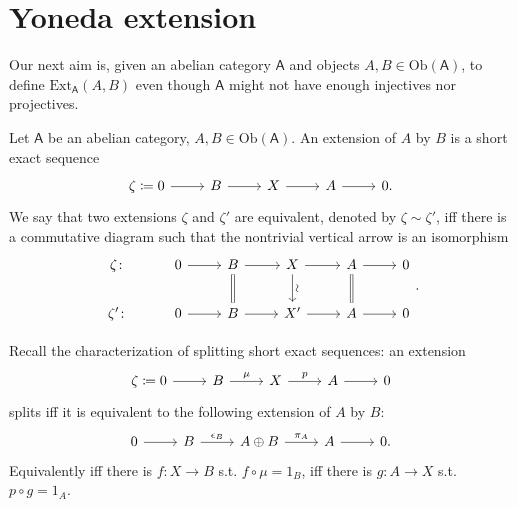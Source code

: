 \section{Yoneda extension}
Our next aim is, given an abelian category $\mathsf{A}$
and objects $A,B \in \mathrm{Ob} \left(\mathsf{A}\right)$,
to define $\mathrm{Ext}^{ }_{ \mathsf{A}} \left( A, B \right)$ even though
$\mathsf{A}$ might not have enough injectives nor projectives.

\begin{defn}[Extension]
	Let $\mathsf{A}$ be an abelian category, $A,B \in \mathrm{Ob} \left(\mathsf{A}\right)$.
	An extension of $A$ by $B$ is a short exact sequence
	\begin{equation*}
	\begin{tikzcd}
		\zeta \coloneqq 0 \arrow[r, "", rightarrow] &
		B \arrow[r, "", rightarrow] &
		X \arrow[r, "", rightarrow] &
		A \arrow[r, "", rightarrow] &
		0
	.\end{tikzcd}
	\end{equation*}
	We say that two extensions $\zeta$ and $\zeta'$ are equivalent, denoted by $\zeta \sim \zeta'$,
	iff there is a commutative diagram such that the nontrivial vertical arrow is an isomorphism
	\begin{equation}
	\begin{tikzcd}
		\zeta \colon &
		0 \arrow[r, "", rightarrow] &
		B \arrow[r, "", rightarrow] \arrow[d, "", equal] &
		X \arrow[r, "", rightarrow] \arrow[d, "\rotatebox{90}{\(\sim\)}", rightarrow] &
		A \arrow[r, "", rightarrow] \arrow[d, "", equal] &
		0\\
		\zeta' \colon &
		0 \arrow[r, "", rightarrow] &
		B \arrow[r, "", rightarrow] &
		X' \arrow[r, "", rightarrow] &
		A \arrow[r, "", rightarrow] &
		0
	\end{tikzcd}
	.\end{equation} 
\end{defn}

\begin{rem}
	Recall the characterization of splitting short exact sequences: an extension
	\begin{equation*}
	\begin{tikzcd}
		\zeta \coloneqq 0 \arrow[r, "", rightarrow] &
		B \arrow[r, "\mu", rightarrow] &
		X \arrow[r, "p", rightarrow] &
		A \arrow[r, "", rightarrow] &
		0
	\end{tikzcd}
	\end{equation*}
	splits iff it is equivalent to the following extension of $A$ by $B$:
	\begin{equation*}
	\begin{tikzcd}
		0 \arrow[r, "", rightarrow] &
		B \arrow[r, "\epsilon_B", rightarrow] &
		A \oplus B \arrow[r, "\pi_A", rightarrow] &
		A \arrow[r, "", rightarrow] &
		0
	.\end{tikzcd}
	\end{equation*}
	Equivalently iff there is $f\colon X \to B$ s.t. $f \circ \mu = 1_B$,
	iff there is $g\colon A \to X$ s.t. $p \circ g = 1_A$.
\end{rem}

